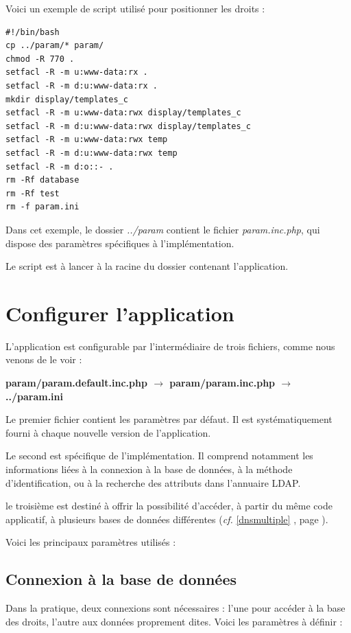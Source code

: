 Voici un exemple de script utilisé pour positionner les droits :

\begin{lstlisting}
#!/bin/bash
cp ../param/* param/
chmod -R 770 .
setfacl -R -m u:www-data:rx .
setfacl -R -m d:u:www-data:rx .
mkdir display/templates_c
setfacl -R -m u:www-data:rwx display/templates_c
setfacl -R -m d:u:www-data:rwx display/templates_c
setfacl -R -m u:www-data:rwx temp
setfacl -R -m d:u:www-data:rwx temp
setfacl -R -m d:o::- .
rm -Rf database
rm -Rf test
rm -f param.ini
\end{lstlisting}

Dans cet exemple, le dossier \textit{../param} contient le fichier \textit{param.inc.php}, qui dispose des paramètres spécifiques à l'implémentation.

Le script est à lancer à la racine du dossier contenant l'application.

\section{Configurer l'application}

L'application est configurable par l'intermédiaire de trois fichiers, comme nous venons de le voir :

\textbf{param/param.default.inc.php $\rightarrow$ param/param.inc.php $\rightarrow$ ../param.ini}

Le premier fichier contient les paramètres par défaut. Il est systématiquement fourni à chaque nouvelle version de l'application.

Le second est spécifique de l'implémentation. Il comprend notamment les informations liées à la connexion à la base de données, à la méthode d'identification, ou à la recherche des attributs dans l'annuaire LDAP. 

le troisième est destiné à offrir la possibilité d'accéder, à partir du même code applicatif, à plusieurs bases de données différentes (\textit{cf.} \ref{dnsmultiple} \textit{}, page \pageref{dnsmultiple}).

Voici les principaux paramètres utilisés :

\subsection{Connexion à la base de données}

Dans la pratique, deux connexions sont nécessaires : l'une pour accéder à la base des droits, l'autre aux données proprement dites. Voici les paramètres à définir :

